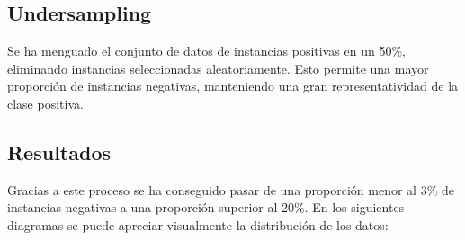 \documentclass[12pt]{report} %
\begin{document}
    \subsection{Undersampling}

    Se ha menguado el conjunto de datos de instancias positivas en un 50\%, eliminando instancias seleccionadas aleatoriamente. Esto permite una mayor proporción de instancias negativas, manteniendo una gran representatividad de la clase positiva.

    \subsection{Resultados}

    Gracias a este proceso se ha conseguido pasar de una proporción menor al 3\% de instancias negativas a una proporción superior al 20\%. En los siguientes diagramas se puede apreciar visualmente la distribución de los datos: 
\end{document}
